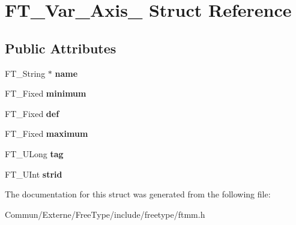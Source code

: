 \hypertarget{struct_f_t___var___axis__}{}\section{F\+T\+\_\+\+Var\+\_\+\+Axis\+\_\+ Struct Reference}
\label{struct_f_t___var___axis__}
\subsection*{Public Attributes}
\begin{DoxyCompactItemize}
\item 
F\+T\+\_\+\+String $\ast$ {\bfseries name}\hypertarget{struct_f_t___var___axis___a8d0e0af322a692999ec3733a3e18a5a4}{}\label{struct_f_t___var___axis___a8d0e0af322a692999ec3733a3e18a5a4}

\item 
F\+T\+\_\+\+Fixed {\bfseries minimum}\hypertarget{struct_f_t___var___axis___aae13a8dea1c96bc3949019e8117e7edb}{}\label{struct_f_t___var___axis___aae13a8dea1c96bc3949019e8117e7edb}

\item 
F\+T\+\_\+\+Fixed {\bfseries def}\hypertarget{struct_f_t___var___axis___a37a6ca4188a6bfd95d9d06538bf1a3dd}{}\label{struct_f_t___var___axis___a37a6ca4188a6bfd95d9d06538bf1a3dd}

\item 
F\+T\+\_\+\+Fixed {\bfseries maximum}\hypertarget{struct_f_t___var___axis___a5704641439e9f318cf3c2b73864e3260}{}\label{struct_f_t___var___axis___a5704641439e9f318cf3c2b73864e3260}

\item 
F\+T\+\_\+\+U\+Long {\bfseries tag}\hypertarget{struct_f_t___var___axis___a01ef9396e34e740c2d2b8c7117094624}{}\label{struct_f_t___var___axis___a01ef9396e34e740c2d2b8c7117094624}

\item 
F\+T\+\_\+\+U\+Int {\bfseries strid}\hypertarget{struct_f_t___var___axis___a297d28ab0f5666e56d7575249ccc75d7}{}\label{struct_f_t___var___axis___a297d28ab0f5666e56d7575249ccc75d7}

\end{DoxyCompactItemize}


The documentation for this struct was generated from the following file\+:\begin{DoxyCompactItemize}
\item 
Commun/\+Externe/\+Free\+Type/include/freetype/ftmm.\+h\end{DoxyCompactItemize}
